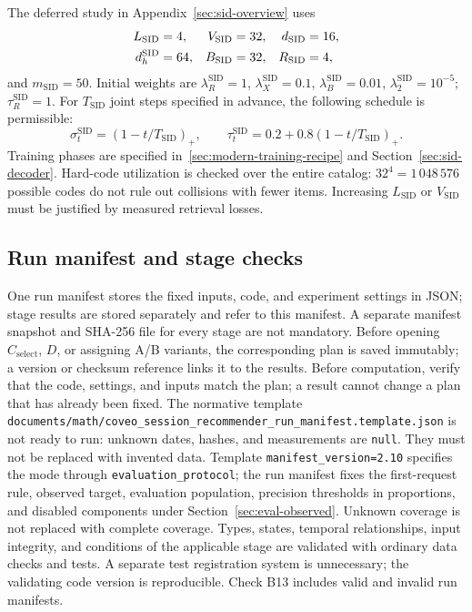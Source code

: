 \documentclass[12pt,a4paper]{article}
\newcommand{\code}[1]{{\ttfamily\small\nolinkurl{#1}}}
\newcommand{\pos}[1]{\left(#1\right)_+}
\theoremstyle{plainru}
\begin{document}
The deferred study in Appendix~\ref{sec:sid-overview} uses
\begin{align}
L_{\mathrm{SID}}&=4,&V_{\mathrm{SID}}&=32,&d_{\mathrm{SID}}&=16,\notag\\
d_h^{\mathrm{SID}}&=64,&B_{\mathrm{SID}}&=32,&R_{\mathrm{SID}}&=4,
\label{eq:app-sid-start}
\end{align}
and $m_{\mathrm{SID}}=50$. Initial weights are
$\lambda_R^{\mathrm{SID}}=1$,
$\lambda_X^{\mathrm{SID}}=0.1$,
$\lambda_B^{\mathrm{SID}}=0.01$,
$\lambda_2^{\mathrm{SID}}=10^{-5}$; $\tau_R^{\mathrm{SID}}=1$.
For $T_{\mathrm{SID}}$ joint steps specified in advance, the following
schedule is permissible:
\begin{equation}\label{eq:app-sid-schedule}
\sigma_t^{\mathrm{SID}}=\pos{1-t/T_{\mathrm{SID}}},\qquad
\tau_t^{\mathrm{SID}}=0.2+0.8\pos{1-t/T_{\mathrm{SID}}}.
\end{equation}
Training phases are specified in~\ref{sec:modern-training-recipe}
and Section~\ref{sec:sid-decoder}. Hard-code utilization is checked
over the entire catalog: $32^4=1\,048\,576$ possible codes do not rule out
collisions with fewer items. Increasing $L_{\mathrm{SID}}$
or $V_{\mathrm{SID}}$ must be justified by measured retrieval losses.


\subsection{Run manifest and stage checks}
\label{app:run-manifest}

One run manifest stores the fixed inputs,
code, and experiment settings in JSON; stage results are stored separately
and refer to this manifest. A separate manifest snapshot and SHA-256 file
for every stage are not mandatory. Before opening $C_{\mathrm{select}}$,
$D$, or assigning A/B variants, the corresponding plan is saved
immutably; a version or checksum reference links it
to the results. Before computation, verify that the code, settings, and inputs
match the plan; a result cannot change a plan that has already been fixed.
The normative template
\code{documents/math/coveo_session_recommender_run_manifest.template.json}
is not ready to run: unknown dates, hashes, and measurements are
\code{null}. They must not be replaced with invented data.
Template \code{manifest_version=2.10} specifies the mode through
\code{evaluation_protocol}; the run manifest fixes
the first-request rule, observed target, evaluation population,
precision thresholds in proportions, and disabled components
under Section~\ref{sec:eval-observed}. Unknown coverage is not replaced with complete coverage.
Types, states, temporal relationships, input integrity, and conditions of the applicable stage
are validated with ordinary data checks and tests. A separate test
registration system is unnecessary; the validating code version is reproducible.
Check B13 includes valid and invalid run manifests.
\end{document}
